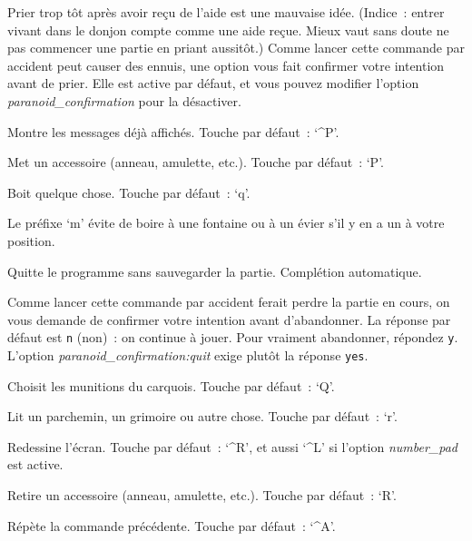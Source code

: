 \documentclass[titlepage]{article}
\begin{document}
\begin{description}
Prier trop tôt après avoir reçu de l'aide est une mauvaise idée.
(Indice~: entrer vivant dans le donjon compte comme une aide reçue.
Mieux vaut sans doute ne pas commencer une partie en priant aussitôt.)
Comme lancer cette commande par accident peut causer des ennuis, une
option vous fait confirmer votre intention avant de prier.
Elle est active par défaut, et vous pouvez modifier l'option
\textit{paranoid\_confirmation}
pour la désactiver.

\item[{\#prevmsg}]
Montre les messages déjà affichés.
Touche par défaut~: `\textasciicircum{}P'.

\item[{\#puton}]
Met un accessoire (anneau, amulette, etc.).
Touche par défaut~: `P'.

\item[{\#quaff}]
Boit quelque chose.
Touche par défaut~: `q'.


Le préfixe `m' évite de boire à une fontaine ou à un évier s'il y en
a un à votre position.

\item[{\#quit}]
Quitte le programme sans sauvegarder la partie.
Complétion automatique.


Comme lancer cette commande par accident ferait perdre la partie en cours,
on vous demande de confirmer votre intention avant d'abandonner.
La réponse par défaut est \texttt{n} (non)~: on continue à jouer.
Pour vraiment abandonner, répondez \texttt{y}.
L'option
\textit{paranoid\_confirmation:quit}
exige plutôt la réponse \texttt{yes}.

\item[{\#quiver}]
Choisit les munitions du carquois.
Touche par défaut~: `Q'.

\item[{\#read}]
Lit un parchemin, un grimoire ou autre chose.
Touche par défaut~: `r'.

\item[{\#redraw}]
Redessine l'écran.
Touche par défaut~: `\textasciicircum{}R', et aussi `\textasciicircum{}L' si l'option
\textit{number\_pad}
est active.

\item[{\#remove}]
Retire un accessoire (anneau, amulette, etc.).
Touche par défaut~: `R'.

\item[{\#repeat}]
Répète la commande précédente.
Touche par défaut~: `\textasciicircum{}A'.


\end{description}
\end{document}
